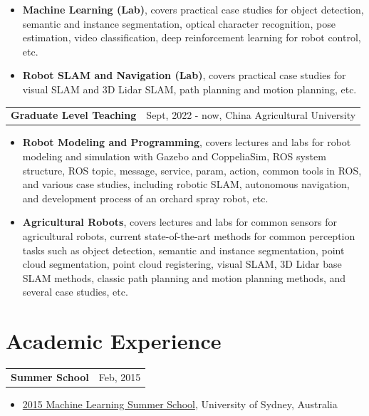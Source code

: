 \documentclass[margin,line]{res}
\begin{document}
\begin{resume}
\begin{itemize}
\item[] \textbf{Machine Learning (Lab)}, covers practical case studies for object detection, semantic and instance segmentation, optical character recognition, pose estimation, video classification, deep reinforcement learning for robot control, etc.

\item[] \textbf{Robot SLAM and Navigation (Lab)}, covers practical case studies for visual SLAM and 3D Lidar SLAM, path planning and motion planning, etc.
\end{itemize}

\begin{tabularx}{\textwidth}{X r}
{\bf Graduate Level Teaching} & Sept, 2022 - now, China Agricultural University\\
\end{tabularx}
\begin{itemize}
\item[] \textbf{Robot Modeling and Programming}, covers lectures and labs for robot modeling and simulation with Gazebo and CoppeliaSim, ROS system structure, ROS topic, message, service, param, action, common tools in ROS, and various case studies, including robotic SLAM, autonomous navigation, and development process of an orchard spray robot, etc.

\item[] \textbf{Agricultural Robots}, covers lectures and labs for common sensors for agricultural robots, current state-of-the-art methods for common perception tasks such as object detection, semantic and instance segmentation, point cloud segmentation, point cloud registering, visual SLAM, 3D Lidar base SLAM methods, classic path planning and motion planning methods, and several case studies, etc.
\end{itemize}

\section{\sc Academic Experience}

\begin{tabularx}{\textwidth}{X r}
{\bf Summer School} & Feb, 2015\\
\end{tabularx}
\begin{itemize}
\item[] \href{http://rp-www.cs.usyd.edu.au/~mlss/}{2015 Machine Learning Summer School}, University of Sydney, Australia


\end{itemize}
\end{resume}
\end{document}
